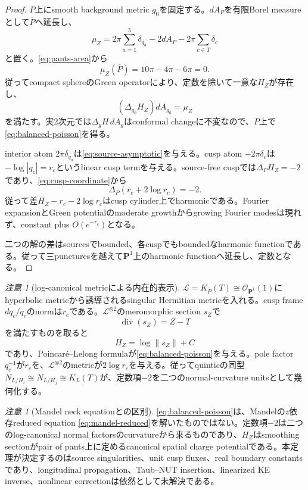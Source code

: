 \documentclass[11pt,a4paper]{ltjsarticle}
\theoremstyle{definition}
\theoremstyle{remark}
\newtheorem{remark}[theorem]{注意}
\newcommand{\PP}{\mathbf P}
\begin{document}
\begin{proof}
$\overline P$上にsmooth background metric $g_0$を固定する。$dA_P$を有限Borel measureとして$\overline P$へ延長し、
\begin{equation}\label{eq:balanced-measure}
 \mu_Z
 =2\pi\sum_{a=1}^5\delta_{q_a}
 -2dA_P
 -2\pi\sum_{c\in T}\delta_c
\end{equation}
と置く。\eqref{eq:pants-area}から
\[
 \mu_Z(\overline P)=10\pi-4\pi-6\pi=0.
\]
従ってcompact sphereのGreen operatorにより、定数を除いて一意な$H_Z$が存在し、
\[
 (\Delta_{g_0}H_Z)dA_{g_0}=\mu_Z
\]
を満たす。実2次元では$\Delta_gH\,dA_g$はconformal changeに不変なので、$P$上で\eqref{eq:balanced-poisson}を得る。

interior atom $2\pi\delta_{q_a}$は\eqref{eq:source-asymptotic}を与える。cusp atom $-2\pi\delta_c$は$-\log|q_c|=r_c$というlinear cusp termを与える。source-free cuspでは$\Delta_PH_Z=-2$であり、\eqref{eq:cusp-coordinate}から
\[
 \Delta_P(r_c+2\log r_c)=-2.
\]
従って差$H_Z-r_c-2\log r_c$はcusp cylinder上でharmonicである。Fourier expansionとGreen potentialのmoderate growthからgrowing Fourier modesは現れず、constant plus $O(e^{-r_c})$となる。

二つの解の差はsourcesでbounded、各cuspでもboundedなharmonic functionである。従って三puncturesを越えて$\PP^1$上のharmonic functionへ延長し、定数となる。
\end{proof}

\begin{remark}[log-canonical metricによる内在的表示]\label{rem:logcanonical-potential}
$\mathcal L=K_{\overline P}(T)\cong\mathcal O_{\PP^1}(1)$にhyperbolic metricから誘導されるsingular Hermitian metricを入れる。cusp frame $dq_c/q_c$のnormは$r_c$である。$\mathcal L^{\otimes2}$のmeromorphic section $s_Z$で
\[
 \operatorname{div}(s_Z)=Z-T
\]
を満たすものを取ると
\[
 H_Z=\log\|s_Z\|+C
\]
であり、Poincaré--Lelong formulaが\eqref{eq:balanced-poisson}を与える。pole factor $q_c^{-1}$が$r_c$を、$\mathcal L^{\otimes2}$のmetricが$2\log r_c$を与える。従ってquinticの同型
$N_{L/H_i}\cong N_{L/H_j}\cong K_L(T)$が、定数項$-2$を二つのnormal-curvature unitsとして幾何化する。
\end{remark}

\begin{remark}[Mandel neck equationとの区別]\label{rem:not-full-neck}
\eqref{eq:balanced-poisson}は、Mandelの$z$依存reduced equation \eqref{eq:mandel-reduced}を解いたものではない。定数項$-2$は二つのlog-canonical normal factorsのcurvatureから来るものであり、$H_Z$はsmoothing sectionがpair of pants上に定めるcanonical spatial charge potentialである。本定理が決定するのはsource singularities、unit cusp fluxes、real boundary constantsであり、longitudinal propagation、Taub--NUT insertion、linearized KE inverse、nonlinear correctionは依然として未解決である。
\end{remark}
\end{document}
